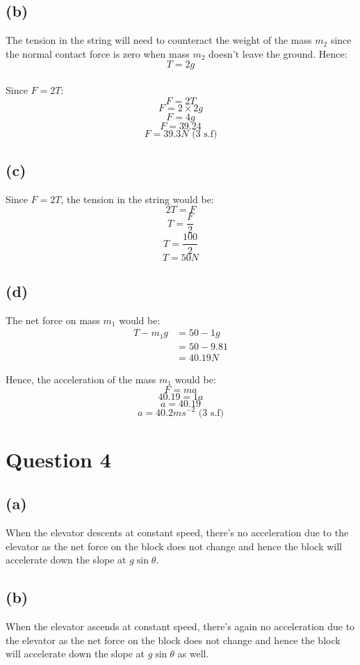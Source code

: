 \documentclass[11pt]{article}
\begin{document}
\newpage

\subsection{(b)}
\label{sec:orge9dc0d8}

The tension in the string will need to counteract the weight of the mass \(m_2\) since the normal contact force is zero when mass \(m_2\) doesn't leave the ground. Hence:
\[T = 2g\]
\\[0pt]

Since \(F = 2T\):
\[F = 2T\]
\[F = 2 \times 2g\]
\[F = 4g\]
\[F = 39.24\]
\[F = 39.3 \si{N} \text{ (3 s.f)}\]

\subsection{(c)}
\label{sec:orgb193e45}

Since \(F = 2T\), the tension in the string would be:
\[2T = F\]
\[T = \frac{F}{2}\]
\[T = \frac{100}{2}\]
\[T = 50 \si{N}\]

\subsection{(d)}
\label{sec:org634addd}
The net force on mass \(m_1\) would be:
\begin{align*}
T - m_1g &= 50 - 1g \\
&= 50 - 9.81 \\
&= 40.19 \si{N}
\end{align*}

Hence, the acceleration of the mass \(m_1\) would be:
\[F = ma\]
\[40.19 = 1a\]
\[a = 40.19\]
\[a = 40.2 \si{ms^{-2}} \text{ (3 s.f)}\]


\section{Question 4}
\label{sec:org39a4893}

\subsection{(a)}
\label{sec:org343fe40}
When the elevator descents at constant speed, there's no acceleration due to the elevator as the net force on the block does not change and hence the block will accelerate down the slope at \(g \sin \theta\).

\subsection{(b)}
\label{sec:orge84b257}
When the elevator ascends at constant speed, there's again no acceleration due to the elevator as the net force on the block does not change and hence the block will accelerate down the slope at \(g \sin \theta\) as well.
\end{document}
